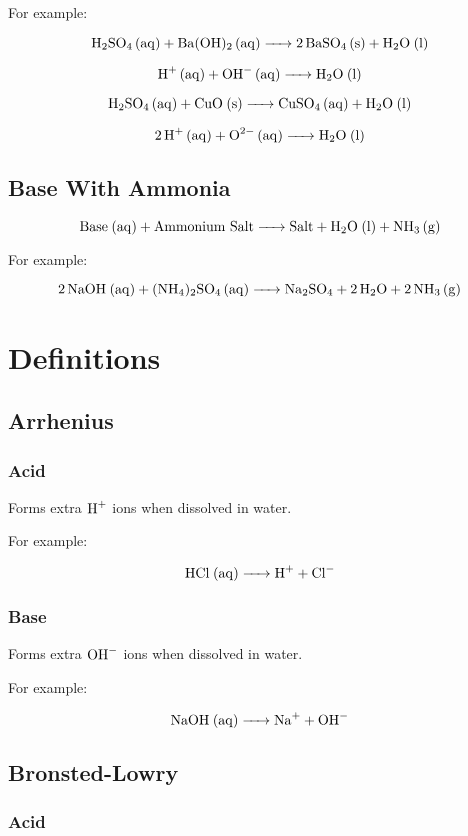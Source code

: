 \documentclass[a4paper,11pt]{article}
\begin{document}
For example:

$$
\ce{H2SO4 (aq) + Ba(OH)2 (aq) -> 2BaSO4 (s) + H2O (l)}
$$

$$
\ce{H+ (aq) + OH- (aq) -> H2O (l)}
$$

$$
\ce{H2SO4 (aq) + CuO (s) -> CuSO4 (aq) + H2O (l)}
$$

$$
\ce{2H+ (aq) + O^2- (aq) -> H2O (l)}
$$


\subsection{Base With Ammonia}

$$
\ce{\text{Base} (aq) + \text{Ammonium Salt} -> \text{Salt} + H2O (l) + NH3 (g)}
$$

For example:

$$
\ce{2NaOH (aq) + (NH4)2SO4 (aq) -> Na2SO4 + 2H2O + 2NH3 (g)}
$$



\section{Definitions}

\subsection{Arrhenius}

\subsubsection{Acid}

Forms extra $\ce{H+}$ ions when dissolved in water.

For example:

$$
\ce{HCl (aq) -> H+ + Cl-}
$$


\subsubsection{Base}

Forms extra $\ce{OH-}$ ions when dissolved in water.

For example:

$$
\ce{NaOH (aq) -> Na+ + OH-}
$$


\subsection{Bronsted-Lowry}

\subsubsection{Acid}
\end{document}
